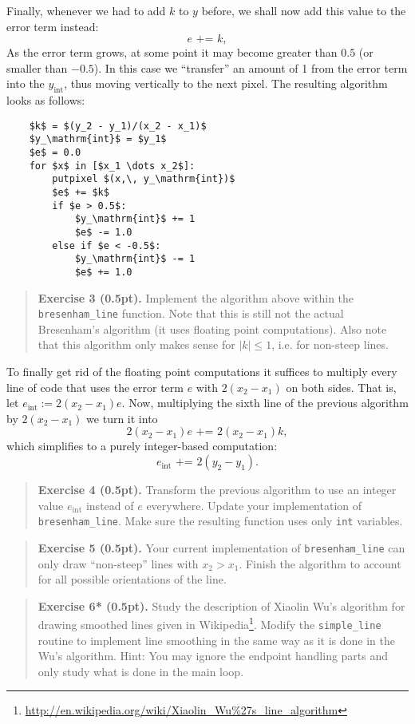 \documentclass{article}
\newenvironment{exercise}[2]{\begin{verse}\textbf{Exercise #1 (#2pt).} }{
\end{verse}\medskip}
\begin{document}
Finally, whenever we had to add $k$ to $y$ before, we shall now add this value to the error term instead:
$$
  e\text{ += }k,
$$
As the error term grows, at some point it may become greater than $0.5$ (or smaller than $-0.5$). In this case we ``transfer'' an amount of 1 from the error term into the $y_\mathrm{int}$, thus moving vertically to the next pixel.
The resulting algorithm looks as follows:
\begin{lstlisting}
	$k$ = $(y_2 - y_1)/(x_2 - x_1)$
	$y_\mathrm{int}$ = $y_1$
	$e$ = 0.0
	for $x$ in [$x_1 \dots x_2$]:
 		putpixel $(x,\, y_\mathrm{int})$
		$e$ += $k$
		if $e > 0.5$:
			$y_\mathrm{int}$ += 1
			$e$ -= 1.0
		else if $e < -0.5$:
			$y_\mathrm{int}$ -= 1
			$e$ += 1.0
\end{lstlisting}

\begin{exercise}{3}{0.5}
Implement the algorithm above within the \verb#bresenham_line# function. Note that this is still not the actual Bresenham's algorithm (it uses floating point computations). Also note that this algorithm only makes sense for $|k|\leq 1$, i.e. for non-steep lines.
\end{exercise}

To finally get rid of the floating point computations it suffices to multiply every line of code that uses the error term $e$ with $2(x_2 - x_1)$ on both sides. That is, let $e_\mathrm{int} := 2(x_2 - x_1)e$. Now, multiplying the sixth line of the previous algorithm by $2(x_2 - x_1)$ we turn it into
$$
 2(x_2 - x_1)e\text{ += }2(x_2 - x_1)k,
$$
which simplifies to a purely integer-based computation:
$$
 e_\mathrm{int}\text{ += }2(y_2 - y_1).
$$

\begin{exercise}{4}{0.5}
Transform the previous algorithm to use an integer value $e_\mathrm{int}$ instead of $e$ everywhere. Update your implementation of \verb#bresenham_line#. Make sure the resulting function uses only \texttt{int} variables.
\end{exercise}

\begin{exercise}{5}{0.5}
Your current implementation of \verb#bresenham_line# can only draw ``non-steep'' lines with $x_2 > x_1$. Finish the algorithm to account for all possible orientations of the line.
\end{exercise}

\begin{exercise}{6*}{0.5}
Study the description of Xiaolin Wu's algorithm for drawing smoothed lines given in Wikipedia\footnote{\url{http://en.wikipedia.org/wiki/Xiaolin_Wu\%27s_line_algorithm}}. Modify the \verb#simple_line# routine to implement line smoothing in the same way as it is done in the Wu's algorithm. Hint: You may ignore the endpoint handling parts and only study what is done in the main loop.
\end{exercise}
\end{document}
